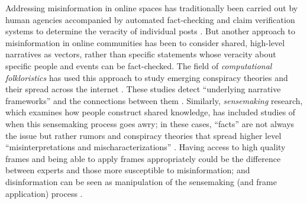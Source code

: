 \documentclass{article} %
\begin{document}
Addressing misinformation in online spaces has traditionally been carried out by human agencies accompanied by automated fact-checking and claim verification systems to determine the veracity of individual posts \cite{guo-etal-2022-survey,gupta-etal-2021-lesa,Warren2025Show}. 
But another approach to misinformation in online communities has been to consider shared, high-level narratives as vectors, rather than specific statements whose veracity about specific people and events can be fact-checked.
The field of \textit{computational folkloristics} \citep{abello2012computational} has used this approach to study emerging conspiracy theories and their spread across the internet \citep{shahsavari2020conspiracy,tangherlini2020automated}. 
These studies detect ``underlying narrative frameworks'' and the connections between them \citep{shahsavari2020conspiracy}.
Similarly, \textit{sensemaking} research, which examines how people construct shared knowledge, has included studies of when this sensemaking process goes awry; in these cases, ``facts'' are not always the issue but rather rumors and conspiracy theories that spread higher level ``misinterpretations and mischaracterizations'' \citep{starbird2024facts}. 
Having access to high quality frames and being able to apply frames appropriately could be the difference between experts and those more susceptible to misinformation; and disinformation can be seen as manipulation of the sensemaking (and frame application) process \citep{klein2007data,starbird2024facts}.

\end{document}
